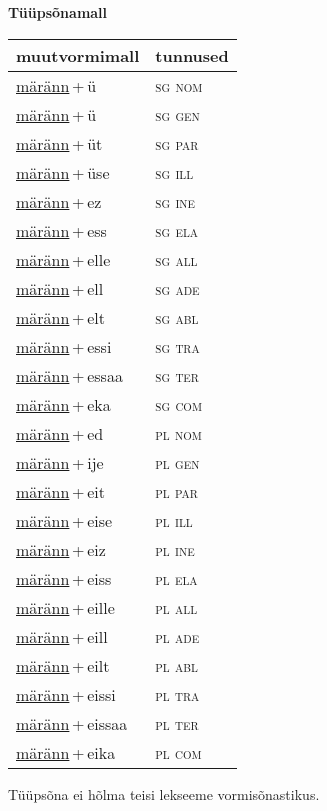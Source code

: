 
\vspace{1.8em}
\begin{minipage}{\textwidth}
\textbf{Tüüpsõnamall \,}\\

\begin{sideways}
\begin{tabular}{l l}
muutvormimall & tunnused \\
\hline
\underline{märänn}\,+\,ü & \textsc{ sg nom } \\
\underline{märänn}\,+\,ü & \textsc{ sg gen } \\
\underline{märänn}\,+\,üt & \textsc{ sg par } \\
\underline{märänn}\,+\,üse & \textsc{ sg ill } \\
\underline{märänn}\,+\,ez & \textsc{ sg ine } \\
\underline{märänn}\,+\,ess & \textsc{ sg ela } \\
\underline{märänn}\,+\,elle & \textsc{ sg all } \\
\underline{märänn}\,+\,ell & \textsc{ sg ade } \\
\underline{märänn}\,+\,elt & \textsc{ sg abl } \\
\underline{märänn}\,+\,essi & \textsc{ sg tra } \\
\underline{märänn}\,+\,essaa & \textsc{ sg ter } \\
\underline{märänn}\,+\,eka & \textsc{ sg com } \\
\underline{märänn}\,+\,ed & \textsc{ pl nom } \\
\underline{märänn}\,+\,ije & \textsc{ pl gen } \\
\underline{märänn}\,+\,eit & \textsc{ pl par } \\
\underline{märänn}\,+\,eise & \textsc{ pl ill } \\
\underline{märänn}\,+\,eiz & \textsc{ pl ine } \\
\underline{märänn}\,+\,eiss & \textsc{ pl ela } \\
\underline{märänn}\,+\,eille & \textsc{ pl all } \\
\underline{märänn}\,+\,eill & \textsc{ pl ade } \\
\underline{märänn}\,+\,eilt & \textsc{ pl abl } \\
\underline{märänn}\,+\,eissi & \textsc{ pl tra } \\
\underline{märänn}\,+\,eissaa & \textsc{ pl ter } \\
\underline{märänn}\,+\,eika & \textsc{ pl com } \\
\end{tabular}
\end{sideways}
\label{tab:tüüpsõnamall-märännü}

\end{minipage}

 
\vspace{1em}
\noindent Tüüpsõna ei hõlma teisi lekseeme vormi\-sõnastikus.
